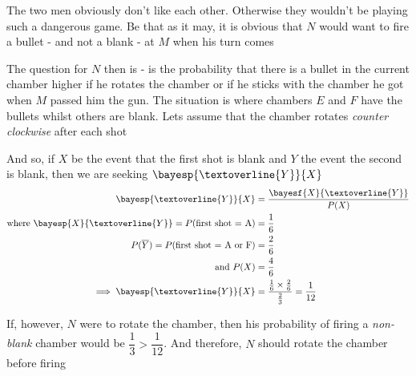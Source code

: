 \begin{solution}[\halfpage]
	The two men obviously don't like each other. Otherwise they wouldn't be playing such 
	a dangerous game. Be that as it may, it is obvious that $N$ would want to fire a bullet - and not a 
	blank - at $M$ when his turn comes
	
	The question for $N$ then is - is the probability that there is a bullet in the current
	chamber higher if he rotates the chamber or if he sticks with the chamber he got when $M$
	passed him the gun. The situation is \asif where chambers $E$ and $F$ have the bullets whilst 
	others are blank. Lets assume that the chamber rotates \textit{counter clockwise} after each shot
	
	And so, if $X$ be the event that the first shot is blank and $Y$ the event the second
	is blank, then we are seeking $\bayesp{\textoverline{Y}}{X}$
	\begin{align}
		\bayesp{\textoverline{Y}}{X} &= \dfrac{\bayesf{X}{\textoverline{Y}}}{P(X)} \\
		\text{where }\bayesp{X}{\textoverline{Y}} = P(\text{first shot = A}) &= \dfrac{1}{6} \\
		P(\overline{Y}) = P(\text{first shot = A or F}) &= \dfrac{2}{6} \\
		\text{and } P(X) &= \dfrac{4}{6} \\
		\implies \bayesp{\textoverline{Y}}{X} &= \dfrac{\frac{1}{6}\times\frac{2}{6}}{\frac{2}{3}} = \dfrac{1}{12}
	\end{align}
	
	If, however, $N$ were to rotate the chamber, then his probability of firing a \textit{non-blank} 
	chamber would be $\dfrac{1}{3} > \dfrac{1}{12}$. And therefore, $N$ should rotate the chamber before firing
	
\end{solution}
\ifprintanswers\begin{codex}\end{codex}\fi

